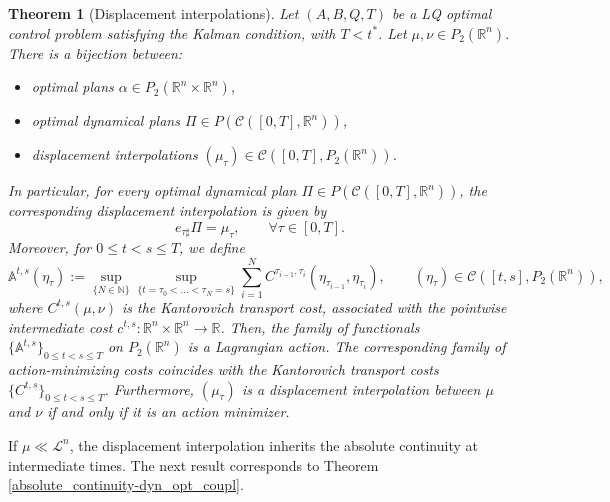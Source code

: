 \documentclass[reqno]{amsart}
\theoremstyle{plain}
\newtheorem{thm}{Theorem}[section]
\theoremstyle{definition}
\theoremstyle{remark}
\newcommand{\R}{\mathbb{R}}
\begin{document}
	\begin{thm}[Displacement interpolations]\label{thm:displacementinterpolation_intro}
		Let $(A,B,Q,T)$ be a LQ optimal control problem satisfying the Kalman condition, with $T<t^*$. Let $\mu, \nu\in P_2(\mathbb{R}^n)$. There is a bijection between:
        \begin{itemize}
            \item optimal plans $\alpha\in P_2(\mathbb{R}^n\times\mathbb{R}^n)$,
            \item optimal dynamical plans $\Pi\in P(\mathcal{C}([0,T],\mathbb{R}^n))$,
            \item displacement interpolations $(\mu_\tau)\in \mathcal{C}([0,T],P_2(\mathbb{R}^n))$.
        \end{itemize}
        In particular, for every optimal dynamical plan $\Pi\in P(\mathcal{C}([0,T],\mathbb{R}^n))$, the corresponding displacement interpolation is given by
		\begin{equation}
			e_{\tau\sharp}\Pi=\mu_\tau,\qquad \forall \tau\in[0,T].
		\end{equation}
		Moreover, for $0\leq t<s\leq T$, we define 
		\begin{equation}
			\mathbb{A}^{t,s}(\eta_{\tau}):=\sup\limits_{\{N\in\mathbb{N}\}}\sup\limits_{\{t=\tau_0<\dots<\tau_N=s\}}\sum_{i=1}^{N}C^{\tau_{i-1},\tau_i}\left(\eta_{\tau_{i-1}},\eta_{\tau_i}\right),\qquad(\eta_{\tau})\in\mathcal{C}([t,s],P_2(\mathbb{R}^n)),
		\end{equation} 
          where $C^{t,s}(\mu,\nu)$ is the Kantorovich transport cost, associated with the pointwise intermediate cost $c^{t,s}:\R^n\times \R^n \to \R$.
		Then, the family of functionals $\{\mathbb{A}^{t,s}\}_{0\leq t<s\leq T}$ on $P_2(\mathbb{R}^n)$ is a Lagrangian action. The corresponding family of action-minimizing costs coincides with the Kantorovich transport costs $\{C^{t,s}\}_{0\leq t<s\leq T}$. Furthermore, $(\mu_\tau)$ is a displacement interpolation between $\mu$ and $\nu$ if and only if it is an action minimizer.
	\end{thm}
    
	If $\mu\ll\mathscr{L}^n$, the displacement interpolation inherits the absolute continuity at intermediate times. The next result corresponds to Theorem \ref{absolute_continuity-dyn_opt_coupl}.
	
\end{document}

